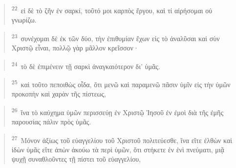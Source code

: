 \documentclass{article}
\newcommand{\currentverse}{1} %
\newcommand{\setcurrentverse}[1]{\renewcommand{\currentverse}{#1}}
\begin{document}
\begin{verse}

\setcurrentverse{22}

\setcounter{footnote}{0}

\textsuperscript{22}~εἰ δὲ τὸ ζῆν ἐν σαρκί, τοῦτό μοι καρπὸς ἔργου, καὶ τί αἱρήσομαι οὐ γνωρίζω.

\end{verse}

\begin{verse}

\setcurrentverse{23}

\setcounter{footnote}{0}

\textsuperscript{23}~συνέχομαι δὲ ἐκ τῶν δύο, τὴν ἐπιθυμίαν ἔχων εἰς τὸ ἀναλῦσαι καὶ σὺν Χριστῷ εἶναι, πολλῷ γὰρ μᾶλλον κρεῖσσον·

\end{verse}

\begin{verse}

\setcurrentverse{24}

\setcounter{footnote}{0}

\textsuperscript{24}~τὸ δὲ ἐπιμένειν τῇ σαρκὶ ἀναγκαιότερον δι’ ὑμᾶς.

\end{verse}

\begin{verse}

\setcurrentverse{25}

\setcounter{footnote}{0}

\textsuperscript{25}~καὶ τοῦτο πεποιθὼς οἶδα, ὅτι μενῶ καὶ παραμενῶ πᾶσιν ὑμῖν εἰς τὴν ὑμῶν προκοπὴν καὶ χαρὰν τῆς πίστεως,

\end{verse}

\begin{verse}

\setcurrentverse{26}

\setcounter{footnote}{0}

\textsuperscript{26}~ἵνα τὸ καύχημα ὑμῶν περισσεύῃ ἐν Χριστῷ Ἰησοῦ ἐν ἐμοὶ διὰ τῆς ἐμῆς παρουσίας πάλιν πρὸς ὑμᾶς.

\end{verse}

\begin{verse}

\setcurrentverse{27}

\setcounter{footnote}{0}

\textsuperscript{27}~Μόνον ἀξίως τοῦ εὐαγγελίου τοῦ Χριστοῦ πολιτεύεσθε, ἵνα εἴτε ἐλθὼν καὶ ἰδὼν ὑμᾶς εἴτε ἀπὼν ἀκούω τὰ περὶ ὑμῶν, ὅτι στήκετε ἐν ἑνὶ πνεύματι, μιᾷ ψυχῇ συναθλοῦντες τῇ πίστει τοῦ εὐαγγελίου,

\end{verse}
\end{document}
